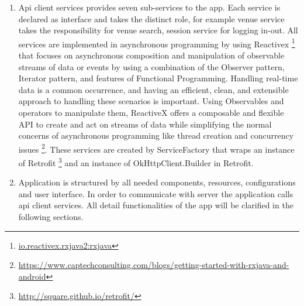  \begin{enumerate}
	\item Api client services provides seven sub-services to the app. Each service is declared as interface and takes the distinct role, for example venue service takes the responsibility for venue search, session service for logging in-out. All services are implemented in asynchronous programming by using Reactivex \footnote{\url{io.reactivex.rxjava2:rxjava}}  that focuses on asynchronous composition and manipulation of observable streams of data or events by using a combination of the Observer pattern, Iterator pattern, and features of Functional Programming. Handling real-time data is a common occurrence, and having an efficient, clean, and extensible approach to handling these scenarios is important. Using Observables and operators to manipulate them, ReactiveX offers a composable and flexible API to create and act on streams of data while simplifying the normal concerns of asynchronous programming like thread creation and concurrency issues \footnote{\url{https://www.captechconsulting.com/blogs/getting-started-with-rxjava-and-android}}. These services are created by ServiceFactory that wraps an instance of Retrofit \footnote{\url{http://square.github.io/retrofit/}} and an instance of OkHttpClient.Builder in Retrofit.

	\item Application is structured by all needed components, resources, configurations and user interface. In order to communicate with server the application calls api client services. All detail functionalities of the app will be clarified in the following sections.
\end{enumerate}


